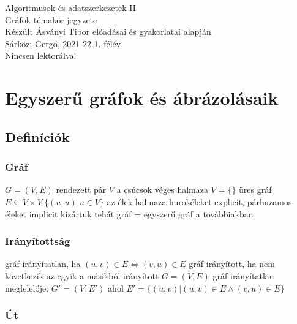 \documentclass[12pt,a4paper]{article}
\begin{document}
\begin{center}
	\huge
	Algoritmusok és adatszerkezetek II\\
	\vspace{1mm}
	\LARGE
	Gráfok témakör jegyzete\\
	\vspace{5mm}
	\large
	Készült Ásványi Tibor előadásai és gyakorlatai alapján\\
	\vspace{5mm}
	Sárközi Gergő, 2021-22-1. félév\\
	Nincsen lektorálva!
\end{center}

\tableofcontents

\pagebreak

\section{Egyszerű gráfok és ábrázolásaik}

\subsection{Definíciók}

\subsubsection{Gráf}

\begin{outline}
	\1 $G=(V,E)$ rendezett pár
	\1 $V$ a csúcsok véges halmaza
		\2 $V=\{\}$ üres gráf
	\1 $E \subseteq V \times V \ \{(u,u) | u \in V\}$ az élek halmaza
		\2 hurokéleket explicit, párhuzamos éleket implicit kizártuk
		\2 tehát gráf = egyszerű gráf a továbbiakban
\end{outline}

\subsubsection{Irányítottság}

\begin{outline}
	\1 gráf irányítatlan, ha $(u,v) \in E \Leftrightarrow (v,u) \in E$
	\1 gráf irányított, ha nem következik az egyik a másikból
	\1 irányított $G=(V,E)$ gráf irányítatlan megfelelője:
		\2 $G'=(V,E')$ ahol $E'=\{(u,v) | (u,v) \in E \wedge (v,u) \in E\}$
\end{outline}

\subsubsection{Út}
\end{document}
